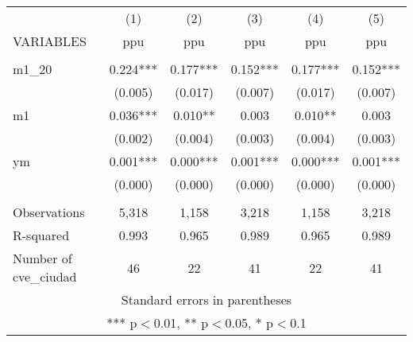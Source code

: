 \begin{tabular}{lccccc} \hline
 & (1) & (2) & (3) & (4) & (5) \\
VARIABLES & ppu & ppu & ppu & ppu & ppu \\ \hline
 &  &  &  &  &  \\
m1\_20 & 0.224*** & 0.177*** & 0.152*** & 0.177*** & 0.152*** \\
 & (0.005) & (0.017) & (0.007) & (0.017) & (0.007) \\
m1 & 0.036*** & 0.010** & 0.003 & 0.010** & 0.003 \\
 & (0.002) & (0.004) & (0.003) & (0.004) & (0.003) \\
ym & 0.001*** & 0.000*** & 0.001*** & 0.000*** & 0.001*** \\
 & (0.000) & (0.000) & (0.000) & (0.000) & (0.000) \\
 &  &  &  &  &  \\
Observations & 5,318 & 1,158 & 3,218 & 1,158 & 3,218 \\
R-squared & 0.993 & 0.965 & 0.989 & 0.965 & 0.989 \\
 Number of cve\_ciudad & 46 & 22 & 41 & 22 & 41 \\ \hline
\multicolumn{6}{c}{ Standard errors in parentheses} \\
\multicolumn{6}{c}{ *** p$<$0.01, ** p$<$0.05, * p$<$0.1} \\
\end{tabular}
